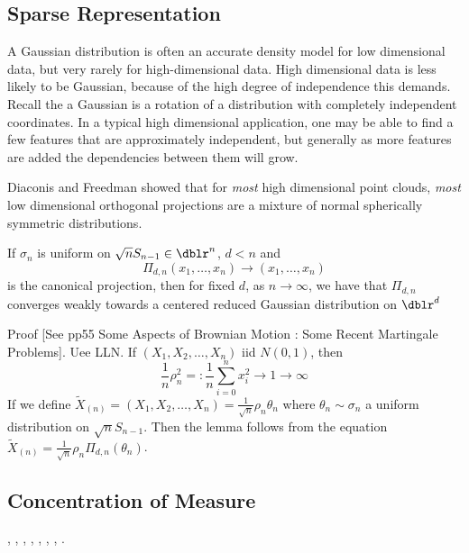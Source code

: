 \subsection{Sparse Representation}
A Gaussian distribution is often an accurate density model for low dimensional data, but very rarely for high-dimensional data. High dimensional data is less likely to be Gaussian, because of the high degree of independence this demands.  Recall the a Gaussian is a rotation of a distribution with completely independent coordinates. In a typical high dimensional application, one may be able to find a few features that are approximately independent, but generally as more features are added the dependencies between them will grow.

Diaconis and Freedman showed that for \textit{most} high dimensional point clouds, \textit{most} low dimensional orthogonal projections are a mixture of normal spherically symmetric distributions.

\begin{lem}
If $\sigma_n$ is uniform on $\sqrt{n}S_{n-1} \in \dblr^n$,  $d<n$ and
\begin{equation*}
\Pi_{d,n} ( x_1, \hdots , x_n) \rightarrow ( x_1, \hdots , x_n)
\end{equation*}
is the canonical projection, then for fixed $d$, as $ n \rightarrow \infty $, we have that
$\Pi_{d,n}$ converges weakly towards a centered reduced Gaussian distribution on $\dblr^d$
\end{lem}

Proof [See pp55 Some Aspects of Brownian Motion : Some Recent Martingale Problems].
Uee LLN.  If $(X_1,X_2, \hdots ,X_n)$ iid $N(0,1)$, then
\begin{equation*}
\frac{1}{n} \rho_{n}^{2} =: \frac{1}{n} \sum_{i=0}^{n} x_{i}^{2} \rightarrow 1  \rightarrow \infty
\end{equation*}
If we define $\tilde{X}_{(n)} = (X_1,X_2, \hdots ,X_n) = \frac{1}{\sqrt{n}} \rho_n \theta_n$ where $\theta_n \sim \sigma_n$ a uniform distribution on $\sqrt{n}S_{n-1}$.  Then the lemma follows from the equation $\tilde{X}_{(n)} = \frac{1}{\sqrt{n}} \rho_n  \Pi_{d,n} (\theta_n)$.

\subsection{Concentration of Measure}
 \cite{MCArora04expanderflows}, \cite{MCBartlett03convexity}, \cite{MCBoucheron04concentrationinequalities},
 \cite{MCFRIEDMAN96computingbetti}, \cite{MCLedoux04spectralgap}, \cite{MCMuyan_ablessing},
 \cite{MCSinclair92improvedbounds}, \cite{MCTalagrand95concentrationof}.

